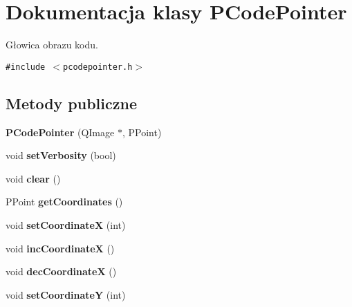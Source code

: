 \hypertarget{classPCodePointer}{
\section{Dokumentacja klasy PCodePointer}
\label{classPCodePointer}
}
Głowica obrazu kodu.  


{\tt \#include $<$pcodepointer.h$>$}

\subsection*{Metody publiczne}
\begin{CompactItemize}
\item 
\hypertarget{classPCodePointer_cd5cd1cd86ff9cf89ac6d2aae5cb52d8}{
\textbf{PCodePointer} (QImage $\ast$, PPoint)}
\label{classPCodePointer_cd5cd1cd86ff9cf89ac6d2aae5cb52d8}

\item 
\hypertarget{classPCodePointer_d738019c8cb766c0863e2c00622d9fc9}{
void \textbf{setVerbosity} (bool)}
\label{classPCodePointer_d738019c8cb766c0863e2c00622d9fc9}

\item 
\hypertarget{classPCodePointer_fb47282905de53ad98a0c3d76dbd0fb0}{
void \textbf{clear} ()}
\label{classPCodePointer_fb47282905de53ad98a0c3d76dbd0fb0}

\item 
\hypertarget{classPCodePointer_c792e5bc527542482542ed22acc9cca4}{
PPoint \textbf{getCoordinates} ()}
\label{classPCodePointer_c792e5bc527542482542ed22acc9cca4}

\item 
\hypertarget{classPCodePointer_9bcf58c97f704e3be2deefb588f91312}{
void \textbf{setCoordinateX} (int)}
\label{classPCodePointer_9bcf58c97f704e3be2deefb588f91312}

\item 
\hypertarget{classPCodePointer_ef8324dbdca82baa094e47e36f978669}{
void \textbf{incCoordinateX} ()}
\label{classPCodePointer_ef8324dbdca82baa094e47e36f978669}

\item 
\hypertarget{classPCodePointer_3b98e9637236aa9d975dc59c0397e625}{
void \textbf{decCoordinateX} ()}
\label{classPCodePointer_3b98e9637236aa9d975dc59c0397e625}

\item 
\hypertarget{classPCodePointer_9fd77f14e39cc30f8cfc583ce97aa2f2}{
void \textbf{setCoordinateY} (int)}
\label{classPCodePointer_9fd77f14e39cc30f8cfc583ce97aa2f2}


\end{CompactItemize}
